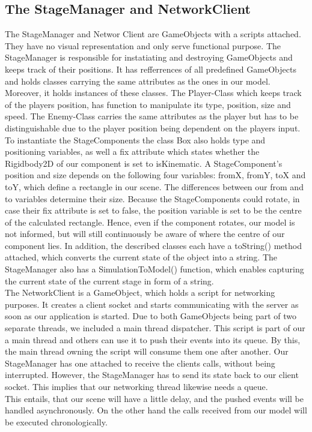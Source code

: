 \subsection{The StageManager and NetworkClient}
The StageManager and Networ Client are GameObjects with a scripts attached. They have no visual representation and only serve functional purpose.
The StageManager is responsible for instatiating and destroying GameObjects and keeps track of their positions. It has refferrences of all predefined GameObjects and holds classes carrying the same attributes as the ones in our model. Moreover, it holds instances of these classes. The Player-Class which keeps track of the players position, has function to manipulate its type, position, size and speed. The Enemy-Class carries the same attributes as the player but has to be distinguishable due to the player position being dependent on the players input. To instantiate the StageComponents the class Box also holds type and positioning variables, as well a fix attribute which states whether the Rigidbody2D of our component is set to isKinematic. A StageComponent's position and size depends on the following four variables: fromX, fromY, toX and toY, which define a rectangle in our scene. The differences between our from and to variables determine their size. Because the StageComponents could rotate, in case their fix attribute is set to false, the position variable is set to be the centre of the calculated rectangle. Hence, even if the component rotates, our model is not informed, but will still continuously be aware of where the centre of our component lies. In addition, the described classes each have a toString() method attached, which converts the current state of the object into a string.
The StageManager also has a SimulationToModel() function, which enables capturing the current state of the current stage in form of a string.\\
The NetworkClient is a GameObject, which holds a script for networking purposes. It creates a client socket and starts communicating with the server as soon as our application is started.
Due to both GameObjects being part of two separate threads, we included a main thread dispatcher. This script is part of our a main thread and others can use it to push their events into its queue. By this, the main thread owning the script will consume them one after another. Our StageManager has one attached to receive the clients calls, without being interrupted. However, the StageManager has to send its state back to our client socket. This implies that our networking thread likewise needs a queue.\\
This entails, that our scene will have a little delay, and the pushed events will be handled asynchronously. On the other hand the calls received from our model will be executed chronologically.

